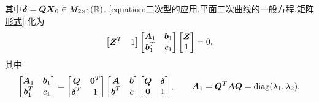 其中\(\boldsymbol\delta = \boldsymbol{Q} \boldsymbol{X}_0 \in M_{2\times1}(\mathbb{R})\).
\cref{equation:二次型的应用.平面二次曲线的一般方程.矩阵形式}
化为\begin{equation}\label{equation:二次型的应用.平面二次曲线的一般方程.矩阵标准形式}
	\begin{bmatrix}
		\boldsymbol{Z}^T & 1
	\end{bmatrix}
	\begin{bmatrix}
		\boldsymbol{A}_1 & \boldsymbol{b}_1 \\
		\boldsymbol{b}_1^T & c_1
	\end{bmatrix}
	\begin{bmatrix}
		\boldsymbol{Z} \\ 1
	\end{bmatrix}
	= 0,
\end{equation}
其中\begin{equation*}
	\begin{bmatrix}
		\boldsymbol{A}_1 & \boldsymbol{b}_1 \\
		\boldsymbol{b}_1^T & c_1
	\end{bmatrix}
	= \begin{bmatrix}
		\boldsymbol{Q} & \boldsymbol0^T \\
		\boldsymbol\delta^T & 1
	\end{bmatrix}
	\begin{bmatrix}
		\boldsymbol{A} & \boldsymbol{b} \\
		\boldsymbol{b}^T & c
	\end{bmatrix}
	\begin{bmatrix}
		\boldsymbol{Q} & \boldsymbol\delta \\
		\boldsymbol0 & 1
	\end{bmatrix},
	\qquad
	\boldsymbol{A}_1
	= \boldsymbol{Q}^T \boldsymbol{A} \boldsymbol{Q}
	= \operatorname{diag}(\lambda_1,\lambda_2).
\end{equation*}

